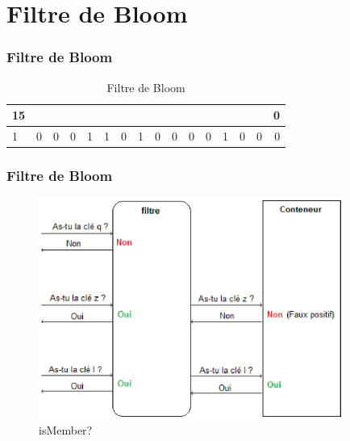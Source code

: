\documentclass[hyperref={pdfpagemode=FullScreen,colorlinks=true},xcolor=pst,dvips]{beamer}\usepackage[french]{babel}
\begin{document}
	\section{Filtre de Bloom}
	\begin{frame}
		\frametitle{Filtre de Bloom}
		\begin{table}[!h]
		\centering		
		\begin{tabular}{|l|*{14}{c|}r|}
		\multicolumn{1}{c}{{\scriptsize 15}} &\multicolumn{1}{c}{}&\multicolumn{1}{c}{}&\multicolumn{1}{c}{}&\multicolumn{1}{c}{}&\multicolumn{1}{c}{}&\multicolumn{1}{c}{}&\multicolumn{1}{c}{}&\multicolumn{1}{c}{}&\multicolumn{1}{c}{}&\multicolumn{1}{c}{}&\multicolumn{1}{c}{}&\multicolumn{1}{c}{}&\multicolumn{1}{c}{}&\multicolumn{1}{c}{}&\multicolumn{1}{c}{{\scriptsize 0}}\\
		\hline
			1 & 0 & 0 & 0 & 1 & 1 & 0 & 1 & 0 & 0 & 0 & 0 & 1 & 0 & 0 & 0 \\
		\hline
		\end{tabular}
		\caption{Filtre de Bloom}
	\end{table}	
	\end{frame}	
	
	\begin{frame}[shrink]
		\frametitle{Filtre de Bloom}
		\begin{figure}[!htbp]
			\centering
			\includegraphics[width=10cm]{ismember.eps}
			\caption{isMember?}
		\end{figure}	
	\end{frame}	
	
\end{document}
